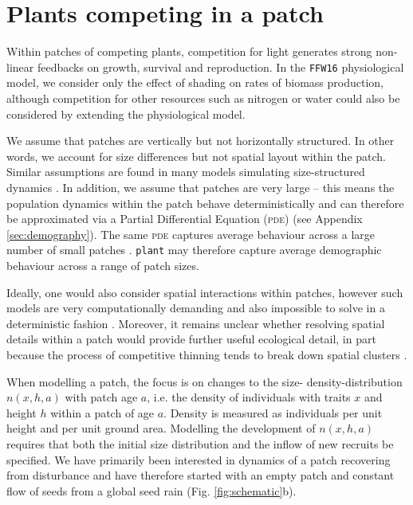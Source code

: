 \documentclass[a4paper,11pt]{article}
\newcommand{\plant}{\texttt{plant}}
\begin{document}
\section{Plants competing in a patch}

Within patches of competing plants, competition for light generates
strong non-linear feedbacks on growth, survival and reproduction. In the
\texttt{FFW16} physiological model, we consider only the effect of
shading on rates of biomass production, although competition for other
resources such as nitrogen or water could also be considered by extending the 
physiological model.

We assume that patches are vertically but not horizontally
structured. In other words, we account for size differences but not spatial 
layout within the patch. Similar assumptions are found in many models
simulating size-structured dynamics
\citep{Shugart-1980,Kohyama-1993, Huston-1987, Moorcroft-2001, Smith-2014}. In addition, 
we assume that patches are very large -- this means the population dynamics 
within the patch behave deterministically \citep{Deroos-1997} and can therefore 
be approximated via a Partial Differential Equation (\textsc{pde}) (see Appendix
\ref{sec:demography}). The same \textsc{pde} captures average behaviour
across a large number of small patches \citep{Moorcroft-2001}. {\plant} may 
therefore capture average demographic behaviour across a range of patch sizes.

Ideally, one would also consider spatial interactions within patches,
however such models are very computationally demanding and also
impossible to solve in a deterministic fashion \citep{Shugart-1980, 
Pacala-1996}. Moreover, it remains unclear whether resolving spatial details within a
patch would provide further useful ecological detail, in part because the
process of competitive thinning tends to break down spatial clusters
\citep{Strigul-2008}.

When modelling a patch, the focus is on changes to the size-
density-distribution \(n(x,h,a)\) with patch age \(a\), i.e. the density of
individuals with traits \(x\) and height \(h\) within a patch of age \(a\).
Density is measured as individuals per unit height and per unit ground area.
Modelling the development of  \(n(x,h,a)\) requires that both the initial size
distribution and the inflow of new recruits be specified. We have primarily
been interested in dynamics of a patch recovering from disturbance and have
therefore started with an empty patch and constant flow of seeds from a global
seed rain (Fig. \ref{fig:schematic}b).
\end{document}
